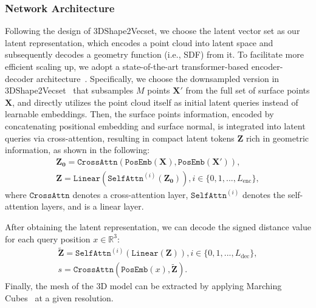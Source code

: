 \subsubsection{Network Architecture}
Following the design of 3DShape2Vecset\cite{zhang20233dshape2vecset}, we choose the latent vector set as our latent representation, which encodes a point cloud into latent space and subsequently decodes a geometry function (i.e., SDF) from it.
To facilitate more efficient scaling up, we adopt a state-of-the-art transformer-based encoder-decoder architecture~\cite{zhang20233dshape2vecset,zhang2024clay,zhao2024michelangelo}.
Specifically, we choose the downsampled version in
3DShape2Vecset~\cite{zhang20233dshape2vecset} that subsamples $M$ points $\mathbf{X}'$ from the full set of surface points $\mathbf{X}$, and directly utilizes the point cloud itself as initial latent queries instead of learnable embeddings.
Then, the surface points information, encoded by concatenating positional embedding and surface normal, is integrated into latent queries via cross-attention, resulting in compact latent tokens $\mathbf{Z}$ rich in geometric information, as shown in the following:
\begin{gather}
\mathbf{Z_0}=\mathtt{CrossAttn}\left(\mathtt{PosEmb}\left(\mathbf{X}\right),\mathtt{PosEmb}\left(\mathbf{X}'\right)\right), \\
\mathbf{Z} = \mathtt{Linear}\left(\mathtt{SelfAttn}^{\left(i\right)}\left(\mathbf{Z_0}\right)\right), i \in \{0,1,...,L_{\text{enc}}\},
\end{gather}
where $\mathtt{CrossAttn}$ denotes a cross-attention layer, $\mathtt{SelfAttn}^{\left(i\right)}$ denotes the self-attention layers, and  is a linear layer.


After obtaining the latent representation, we can decode the signed distance value for each query position $x \in \mathbb{R}^3$:
\begin{gather}
\mathbf{\widetilde{Z}}=\mathtt{SelfAttn}^{\left(i\right)}\left(\mathtt{Linear}\left(\mathbf{Z}\right)\right), i \in \{0, 1, ..., L_{\text{dec}}\}, \\
s=\mathtt{CrossAttn}\left(\mathtt{PosEmb}\left(x\right), \mathbf{\widetilde{Z}}\right).
\end{gather}
Finally, the mesh of the 3D model can be extracted by applying Marching Cubes~\cite{DBLP:conf/siggraph/LorensenC87} at a given resolution.

